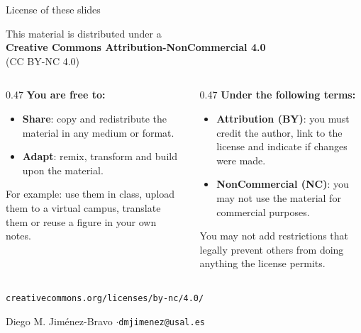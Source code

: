 \documentclass[aspectratio=169]{beamer}
\makeatletter
\newcommand{\titleslide}{%
\begin{frame}
  \titlepage
  \vspace{-0.5em}
  {\footnotesize Diego M. Jiménez-Bravo \quad$\cdot$\quad \texttt{dmjimenez@usal.es}}
\end{frame}
}
\makeatother
\begin{document}
\begin{frame}{License of these slides}
  \begin{center}
    This material is distributed under a\\[0.3em]
    {\large\textbf{\textcolor{usalred}{Creative Commons Attribution-NonCommercial 4.0}}}\\[0.2em]
    {\footnotesize (CC BY-NC 4.0)}
  \end{center}
  \vspace{0.3em}
  \small
  \begin{columns}[t]
    \begin{column}{0.47\textwidth}
      \textbf{\textcolor{usalred}{You are free to:}}
      \begin{itemize}
        \item \textbf{Share}: copy and redistribute the material in any medium or format.
        \item \textbf{Adapt}: remix, transform and build upon the material.
      \end{itemize}
      {\footnotesize For example: use them in class, upload them to a virtual campus, translate them or reuse a figure in your own notes.}
    \end{column}
    \begin{column}{0.47\textwidth}
      \textbf{\textcolor{usalred}{Under the following terms:}}
      \begin{itemize}
        \item \textbf{Attribution (BY)}: you must credit the author, link to the license and indicate if changes were made.
        \item \textbf{NonCommercial (NC)}: you may not use the material for commercial purposes.
      \end{itemize}
      {\footnotesize You may not add restrictions that legally prevent others from doing anything the license permits.}
    \end{column}
  \end{columns}
  \vspace{0.4em}
  \begin{center}
    {\footnotesize\texttt{creativecommons.org/licenses/by-nc/4.0/}}
  \end{center}
\end{frame}

\titleslide
\end{document}

